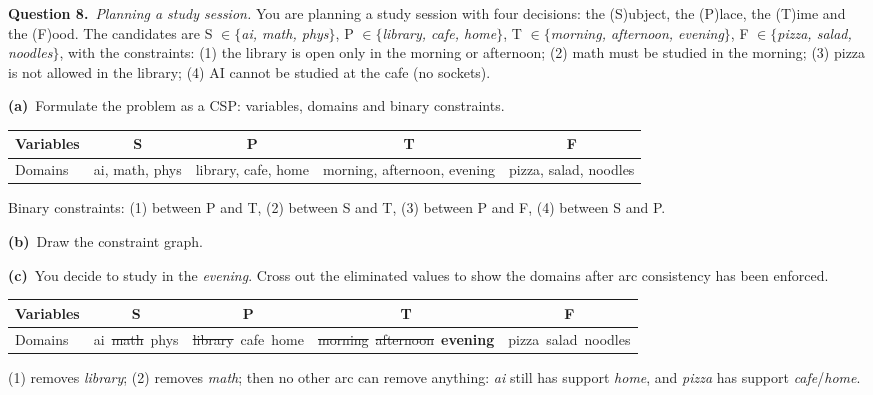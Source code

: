 \documentclass[11pt,a4paper]{article}
\newcommand{\question}[1]{\par\medskip\noindent\textbf{Question #1.}\ }
\newcommand{\subq}[1]{\par\smallskip\noindent\textbf{#1}\ }
\begin{document}
\question{8}\textit{Planning a study session.} You are planning a study session with four decisions: the (S)ubject, the (P)lace, the (T)ime and the (F)ood. The candidates are S $\in\{$\emph{ai, math, phys}$\}$, P $\in\{$\emph{library, cafe, home}$\}$, T $\in\{$\emph{morning, afternoon, evening}$\}$, F $\in\{$\emph{pizza, salad, noodles}$\}$, with the constraints: (1) the library is open only in the morning or afternoon; (2) math must be studied in the morning; (3) pizza is not allowed in the library; (4) AI cannot be studied at the cafe (no sockets).
\subq{(a)}Formulate the problem as a CSP: variables, domains and binary constraints.
\begin{solbox}
\begin{center}\small\begin{tabular}{|l|c|c|c|c|}\hline Variables & \textbf{S} & \textbf{P} & \textbf{T} & \textbf{F}\\ \hline Domains & ai, math, phys & library, cafe, home & morning, afternoon, evening & pizza, salad, noodles\\ \hline\end{tabular}\end{center}Binary constraints: (1) between P and T, (2) between S and T, (3) between P and F, (4) between S and P.
\end{solbox}
\subq{(b)}Draw the constraint graph.
\begin{solbox}
\begin{center}
\begin{adjustbox}{max width=\linewidth}
\end{adjustbox}
\end{center}
\end{solbox}
\subq{(c)}You decide to study in the \emph{evening}. Cross out the eliminated values to show the domains after arc consistency has been enforced.
\begin{solbox}
\begin{center}\small\begin{tabular}{|l|c|c|c|c|}\hline Variables & \textbf{S} & \textbf{P} & \textbf{T} & \textbf{F}\\ \hline Domains & ai\ \textcolor{red!70!black}{\sout{math}}\ phys & \textcolor{red!70!black}{\sout{library}}\ cafe\ home & \textcolor{red!70!black}{\sout{morning}}\ \textcolor{red!70!black}{\sout{afternoon}}\ \textbf{evening} & pizza\ salad\ noodles\\ \hline\end{tabular}\end{center}(1) removes \emph{library}; (2) removes \emph{math}; then no other arc can remove anything: \emph{ai} still has support \emph{home}, and \emph{pizza} has support \emph{cafe}/\emph{home}.
\end{solbox}
\end{document}
